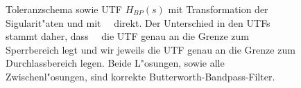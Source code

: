 \begin{figure}[!htb]
\vspace*{-3mm}\begin{center}
  \vspace*{-7mm}\caption{Toleranzschema sowie UTF $H_{BP}(s)$ mit Transformation der Sigularit"aten und mit \matlogo~~direkt. Der Unterschied in den UTFs stammt daher, dass \matlogo~~die UTF genau an die Grenze zum Sperrbereich legt und wir jeweils die UTF genau an die Grenze zum Durchlassbereich legen. Beide L"osungen, sowie alle Zwischenl"osungen, sind korrekte Butterworth-Bandpass-Filter.}
\end{center}
\vspace*{-6mm}
\end{figure}\\




